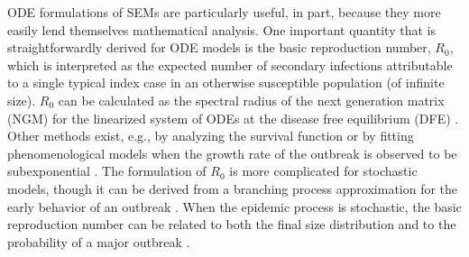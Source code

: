 ODE formulations of SEMs are particularly useful, in part, because they more easily lend themselves mathematical analysis. One important quantity that is straightforwardly derived for ODE models is the basic reproduction number, $ R_0 $, which is interpreted as the expected number of secondary infections attributable to a single typical index case in an otherwise susceptible population (of infinite size). $ R_0 $ can be calculated as the spectral radius of the next generation matrix (NGM) for the linearized system of ODEs at the disease free equilibrium (DFE) \cite{diekmann2009construction,van2017reproduction}. Other methods exist, e.g., by analyzing the survival function or by fitting phenomenological models when the growth rate of the outbreak is observed to be subexponential \cite{van2017reproduction}. The formulation of $ R_0 $ is more complicated for stochastic models, though it can be derived from a branching process approximation for the early behavior of an outbreak \cite{allen2008introduction}. When the epidemic process is stochastic, the basic reproduction number can be related to both the final size distribution and to the probability of a major outbreak \cite{allen2017primer,greenwood2009stochastic,miller2012note}.

